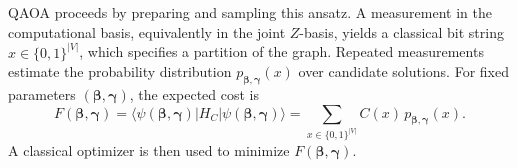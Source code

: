 \documentclass[conference]{IEEEtran}
\begin{document}
QAOA proceeds by preparing and sampling this ansatz. A measurement in the
computational basis, equivalently in the joint \(Z\)-basis, yields a classical
bit string~\(x\in\{0,1\}^{|V|}\), which specifies a partition of the graph.
Repeated measurements estimate the probability distribution
\(p_{\boldsymbol{\beta},\boldsymbol{\gamma}}(x)\) over candidate solutions. For
fixed parameters \((\boldsymbol{\beta},\boldsymbol{\gamma})\), the expected cost
is
\begin{equation}
    F(\boldsymbol{\beta},\boldsymbol{\gamma})
=
\langle \psi(\boldsymbol{\beta},\boldsymbol{\gamma})|H_C|\psi(\boldsymbol{\beta},\boldsymbol{\gamma})\rangle=\sum_{x\in\{0,1\}^{|V|}} C(x)\,p_{\boldsymbol{\beta},\boldsymbol{\gamma}}(x).
\label{eq:expected_cost}
\end{equation}
A classical optimizer is then used to minimize
\(F(\boldsymbol{\beta},\boldsymbol{\gamma})\).
\end{document}
